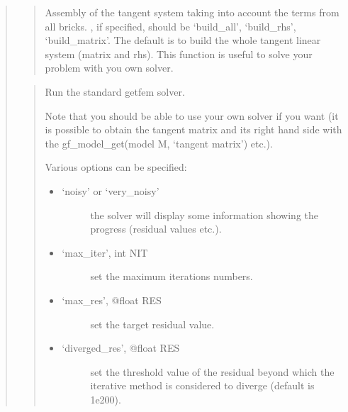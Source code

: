 \documentclass[a4paper,11pt,english]{sphinxmanual}
\begin{document}
\begin{quote}
\begin{quote}
Assembly of the tangent system taking into account the terms
from all bricks. , if specified, should be ‘build\_all’,
‘build\_rhs’, ‘build\_matrix’.
The default is to build the whole
tangent linear system (matrix and rhs). This function is useful
to solve your problem with you own solver.
\end{quote}

\begin{quote}

Run the standard getfem solver.

Note that you should be able to use your own solver if you want
(it is possible to obtain the tangent matrix and its right hand
side with the gf\_model\_get(model M, ‘tangent matrix’) etc.).

Various options can be specified:
\begin{itemize}
\item {} \begin{description}
\item[{‘noisy’ or ‘very\_noisy’}] \leavevmode
the solver will display some information showing the progress
(residual values etc.).

\end{description}

\item {} \begin{description}
\item[{‘max\_iter’, int NIT}] \leavevmode
set the maximum iterations numbers.

\end{description}

\item {} \begin{description}
\item[{‘max\_res’, @float RES}] \leavevmode
set the target residual value.

\end{description}

\item {} \begin{description}
\item[{‘diverged\_res’, @float RES}] \leavevmode
set the threshold value of the residual beyond which the iterative
method is considered to diverge (default is 1e200).

\end{description}


\end{itemize}
\end{quote}
\end{quote}
\end{document}
